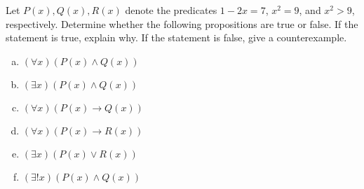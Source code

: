\documentclass[11pt,letterpaper]{article}
\begin{document}
\newpage





 Let $P(x), Q(x), R(x)$ denote the predicates $1 - 2x= 7$, $x^2= 9$, and $x^2 > 9$, respectively. Determine whether the following propositions are true or false. If the statement is true, explain why. If the statement is false, give a counterexample. 
        \begin{enumerate}[(a)]
        \item $(\forall x)(P(x) \wedge Q(x))$
        \item $(\exists x)(P(x) \wedge Q(x))$
        \item $(\forall x)(P(x) \to Q(x))$
        \item $(\forall x)(P(x) \to R(x))$
        \item $(\exists x)(P(x) \vee R(x))$
        \item $(\exists! x)(P(x) \wedge Q(x))$ 
        \end{enumerate} \pspace
\end{document}
